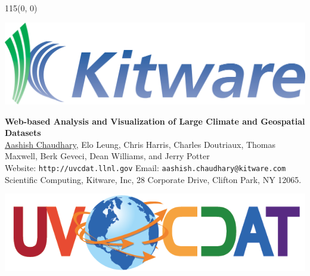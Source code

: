 \documentclass[a0,landscape]{a0poster}
\newenvironment{pcol}[1]{
  \begin{minipage}[t]{#1}
}{
  \end{minipage}
}
\newcommand{\pbox}[4]{
\begin{minipage}[t][#2][t]{#1}
#4
\end{minipage}
}%
\begin{document}
\begin{textblock}{115}(0, 0)
\begin{pcol}{\headerwidth}
\begin{minipage}[c][\headerheight][c]{0.1\textwidth}
  \begin{center}
    \includegraphics[width=1.0\textwidth]{images/Kitware}
  \end{center}
\end{minipage}
\begin{minipage}[c][\headerheight][c]{0.755\textwidth}
  \begin{center}
    {\Huge \textbf{Web-based Analysis and Visualization of Large Climate and Geospatial Datasets}}\\[10mm]
    {\Large \underline{Aashish Chaudhary}, Elo Leung, Chris Harris, Charles Doutriaux, Thomas Maxwell, Berk Geveci, Dean Williams, and Jerry Potter}\\[6.5mm]
    {\large Website: \texttt{http://uvcdat.llnl.gov}\hspace*{1.5cm} Email: \texttt{aashish.chaudhary@kitware.com}}\\[6.5mm]
    {\large Scientific Computing, Kitware, Inc, 28 Corporate Drive, Clifton Park, NY 12065.}
  \end{center}
\end{minipage}
\begin{minipage}[c][\headerheight][c]{0.1\textwidth}
  \begin{center}
    \includegraphics[width=1.5\textwidth]{images/UV-CDAT_logo}
  \end{center}
\end{minipage}
\end{pcol}
\end{textblock}
\end{document}
